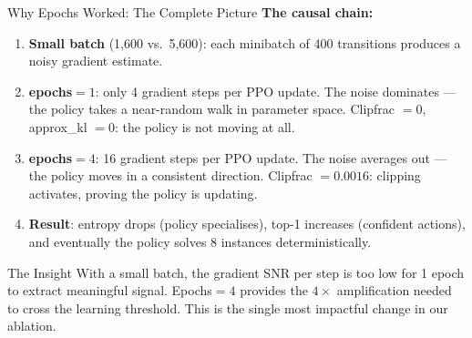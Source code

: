 \documentclass[aspectratio=169,11pt]{beamer}
\begin{document}
\begin{frame}{Why Epochs Worked: The Complete Picture}
  \small
  \textbf{The causal chain:}

  \medskip
  \begin{enumerate}\setlength\itemsep{4pt}
    \item \textbf{Small batch} (1{,}600 vs.\ 5{,}600): each minibatch of 400 transitions
      produces a noisy gradient estimate.
    \item \textbf{epochs${}=1$}: only 4 gradient steps per PPO update.
      The noise dominates --- the policy takes a near-random walk in parameter space.
      Clipfrac $= 0$, approx\_kl $= 0$: the policy is not moving at all.
    \item \textbf{epochs${}=4$}: 16 gradient steps per PPO update.
      The noise averages out --- the policy moves in a consistent direction.
      Clipfrac $= 0.0016$: clipping activates, proving the policy is updating.
    \item \textbf{Result}: entropy drops (policy specialises), top-1 increases
      (confident actions), and eventually the policy solves 8 instances deterministically.
  \end{enumerate}

  \medskip
  \begin{block}{The Insight}
    With a small batch, the gradient SNR per step is too low for 1 epoch to extract
    meaningful signal.  Epochs${}=4$ provides the $4\times$ amplification needed to cross
    the learning threshold.  This is the single most impactful change in our ablation.
  \end{block}
\end{frame}
\end{document}
